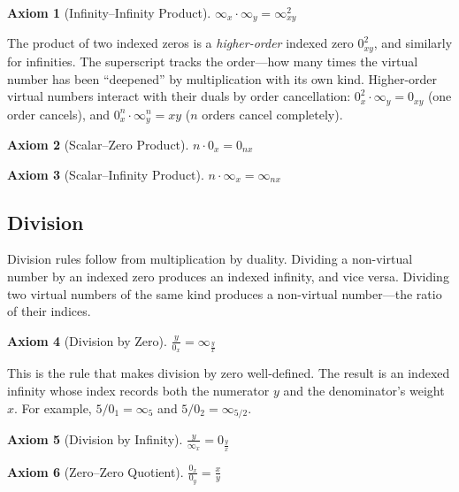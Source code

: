 \documentclass[12pt]{article}
\theoremstyle{definition}
\newtheorem{axiom}{Axiom}
\theoremstyle{remark}
\newcommand{\vz}[1]{0_{#1}}             %
\newcommand{\vi}[1]{\infty_{#1}}        %
\newcommand{\vzn}[2]{0^{#1}_{#2}}       %
\newcommand{\vin}[2]{\infty^{#1}_{#2}}  %
\begin{document}
\begin{axiom}[Infinity--Infinity Product]
\label{ax:ii}
$\vi{x} \cdot \vi{y} = \vin{2}{xy}$
\end{axiom}

The product of two indexed zeros is a \emph{higher-order} indexed zero
$\vzn{2}{xy}$, and similarly for infinities. The superscript tracks the
order---how many times the virtual number has been ``deepened'' by
multiplication with its own kind. Higher-order virtual numbers interact
with their duals by order cancellation: $\vzn{2}{x} \cdot \vi{y} = \vz{xy}$
(one order cancels), and $\vzn{n}{x} \cdot \vin{n}{y} = xy$ ($n$ orders
cancel completely).

\begin{axiom}[Scalar--Zero Product]
\label{ax:nz}
$n \cdot \vz{x} = \vz{nx}$
\end{axiom}

\begin{axiom}[Scalar--Infinity Product]
\label{ax:ni}
$n \cdot \vi{x} = \vi{nx}$
\end{axiom}

\subsection{Division}

Division rules follow from multiplication by duality. Dividing a
non-virtual number by an indexed zero produces an indexed infinity,
and vice versa. Dividing two virtual numbers of the same kind
produces a non-virtual number---the ratio of their indices.

\begin{axiom}[Division by Zero]
\label{ax:divzero}
$\displaystyle\frac{y}{\vz{x}} = \vi{\frac{y}{x}}$
\end{axiom}

This is the rule that makes division by zero well-defined. The result
is an indexed infinity whose index records both the numerator $y$ and
the denominator's weight $x$. For example, $5 / \vz{1} = \vi{5}$ and
$5 / \vz{2} = \vi{5/2}$.

\begin{axiom}[Division by Infinity]
\label{ax:divinf}
$\displaystyle\frac{y}{\vi{x}} = \vz{\frac{y}{x}}$
\end{axiom}

\begin{axiom}[Zero--Zero Quotient]
\label{ax:zzdiv}
$\displaystyle\frac{\vz{x}}{\vz{y}} = \frac{x}{y}$
\end{axiom}
\end{document}
